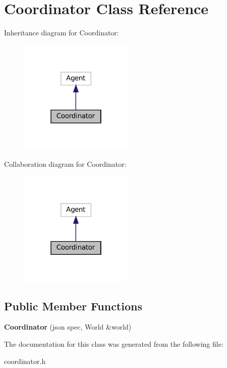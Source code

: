 \hypertarget{classCoordinator}{}\section{Coordinator Class Reference}
\label{classCoordinator}


Inheritance diagram for Coordinator\+:
\nopagebreak
\begin{figure}[H]
\begin{center}
\leavevmode
\includegraphics[width=154pt]{classCoordinator__inherit__graph}
\end{center}
\end{figure}


Collaboration diagram for Coordinator\+:
\nopagebreak
\begin{figure}[H]
\begin{center}
\leavevmode
\includegraphics[width=154pt]{classCoordinator__coll__graph}
\end{center}
\end{figure}
\subsection*{Public Member Functions}
\begin{DoxyCompactItemize}
\item 
\mbox{\label{classCoordinator_ab85d4c76f4356c066eaba655c0533c23}} 
{\bfseries Coordinator} (json spec, World \&world)
\end{DoxyCompactItemize}


The documentation for this class was generated from the following file\+:\begin{DoxyCompactItemize}
\item 
coordinator.\+h\end{DoxyCompactItemize}
